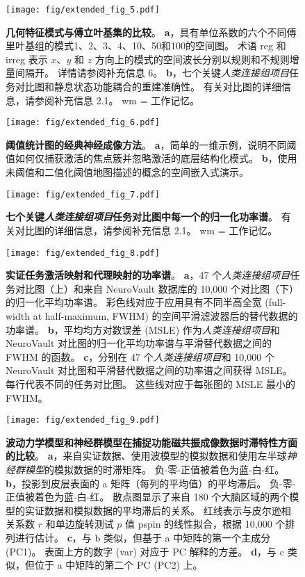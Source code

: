 \documentclass[lang=cn,a4paper,newtx,citestyle=gb7714-2015, bibstyle=gb7714-2015]{elegantpaper}
\begin{document}
\begin{figure}[!htb] 
	\centering
	\texttt{[image: fig/extended\_fig\_5.pdf]}
	\caption{\textbf{几何特征模式与傅立叶基集的比较}。
	\textbf{a}，具有单位系数的六个不同傅里叶基组的模式1、2、3、4、10、50和100的空间图。
	术语 reg 和 irreg 表示 $ x $、$ y $ 和 $ z $ 方向上的模式的空间波长分别以规则和不规则增量间隔开。
	详情请参阅补充信息 6。
	\textbf{b}，七个关键\textit{人类连接组项目}任务对比图和静息状态功能耦合的重建准确性。
	有关对比图的详细信息，请参阅补充信息 2.1。
	wm = 工作记忆。}
	\label{fig:extended_fig_5}
\end{figure}


\begin{figure}[!htb] 
	\centering
	\texttt{[image: fig/extended\_fig\_6.pdf]}
	\caption{\textbf{阈值统计图的经典神经成像方法}。
	\textbf{a}，简单的一维示例，说明不同阈值如何仅捕获激活的焦点簇并忽略激活的底层结构化模式。
	\textbf{b}，使用未阈值和二值化阈值地图描述的概念的空间嵌入式演示。}
	\label{fig:extended_fig_6}
\end{figure}


\begin{figure}[!htb] 
	\centering
	\texttt{[image: fig/extended\_fig\_7.pdf]}
	\caption{\textbf{七个关键\textit{人类连接组项目}任务对比图中每一个的归一化功率谱}。
	有关对比图的详细信息，请参阅补充信息 2.1。
	wm = 工作记忆。}
	\label{fig:extended_fig_7}
\end{figure}


\begin{figure}[!htb] 
	\centering
	\texttt{[image: fig/extended\_fig\_8.pdf]}
	\caption{\textbf{实证任务激活映射和代理映射的功率谱}。
	\textbf{a}，47 个\textit{人类连接组项目}任务对比图（上）和来自 NeuroVault 数据库的 10,000 个对比图（下）的归一化平均功率谱。
	彩色线对应于应用具有不同半高全宽 (full-width at
	half-maximum, FWHM) 的空间平滑滤波器后的替代数据的功率谱。
	\textbf{b}，平均均方对数误差 (MSLE) 作为\textit{人类连接组项目}和 NeuroVault 对比图的归一化平均功率谱与平滑替代数据之间的 FWHM 的函数。
	\textbf{c}，分别在 47 个\textit{人类连接组项目}和 10,000 个 NeuroVault 对比图和平滑替代数据之间的功率谱之间获得 MSLE。
	每行代表不同的任务对比图。
	这些线对应于每张图的 MSLE 最小的 FWHM。}
	\label{fig:extended_fig_8}
\end{figure}


\begin{figure}[!htb] 
	\centering
	\texttt{[image: fig/extended\_fig\_9.pdf]}
	\caption{\textbf{波动力学模型和神经群模型在捕捉功能磁共振成像数据时滞特性方面的比较}。
	\textbf{a}，来自实证数据、使用波模型的模拟数据和使用左半球\textit{神经群模型}的模拟数据的时滞矩阵。
	负-零-正值被着色为蓝-白-红。
	\textbf{b}，投影到皮层表面的 a 矩阵（每列的平均值）的平均滞后。
	负-零-正值被着色为蓝-白-红。
	散点图显示了来自 180 个大脑区域的两个模型的实证数据和模拟数据的平均滞后的关系。
	红线表示与皮尔逊相关系数 $ r $ 和单边旋转测试 $ p $ 值 pspin 的线性拟合，根据 10,000 个排列进行估计。 
	\textbf{c}，与 b 类似，但基于 a 中矩阵的第一个主成分 (PC1)。
	表面上方的数字 (var) 对应于 PC 解释的方差。
	\textbf{d}，与 c 类似，但位于 a 中矩阵的第二个 PC (PC2) 上。}
	\label{fig:extended_fig_9}
\end{figure}
\end{document}
